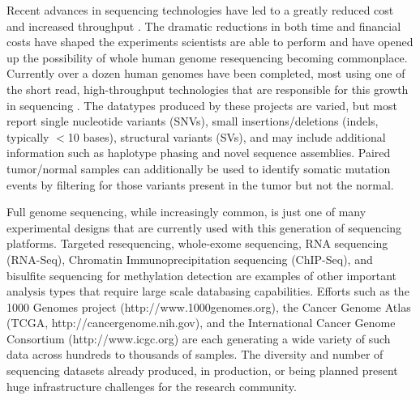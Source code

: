 \documentclass[10pt]{bmc_article}
\newenvironment{bmcformat}{\begin{raggedright}\baselineskip20pt\sloppy\setboolean{publ}{false}}{\end{raggedright}\baselineskip20pt\sloppy}
\begin{document}
\begin{bmcformat}
Recent advances in sequencing technologies have led to a greatly reduced cost and increased throughput \cite{snyder2010personal}. The dramatic reductions in both time and financial costs have shaped the experiments scientists are able to perform and have opened up the possibility of whole human genome resequencing becoming commonplace. Currently over a dozen human genomes have been completed, most using one of the short read, high-throughput technologies that are responsible for this growth in sequencing \cite{lander2001initial,levy2007diploid,wheeler2008complete,pushkarev2009single,wang2008diploid,bentley2008accurate,mckernan2009sequence,ahn2009first,kim2009highly,drmanac2010human,ley2008dna,mardis2009recurring,pleasance2010small,pleasance2010comprehensive,clark2010u87mg}. The datatypes produced by these projects are varied, but most report single nucleotide variants (SNVs), small insertions/deletions (indels, typically $<$10 bases), structural variants (SVs), and may include additional information such as haplotype phasing and novel sequence assemblies. Paired tumor/normal samples can additionally be used to identify somatic mutation events by filtering for those variants present in the tumor but not the normal.

Full genome sequencing, while increasingly common, is just one of many experimental designs that are currently used with this generation of sequencing platforms. Targeted resequencing, whole-exome sequencing, RNA sequencing (RNA-Seq), Chromatin Immunoprecipitation sequencing (ChIP-Seq), and bisulfite sequencing for methylation detection are examples of other important analysis types that require large scale databasing capabilities. Efforts such as the 1000 Genomes project (http://www.1000genomes.org), the Cancer Genome Atlas (TCGA, http://cancergenome.nih.gov), and the International Cancer Genome Consortium (http://www.icgc.org) are each generating a wide variety of such data across hundreds to thousands of samples. The diversity and number of sequencing datasets already produced, in production, or being planned present huge infrastructure challenges for the research community.


\end{bmcformat}
\end{document}
